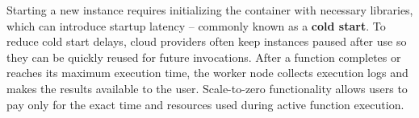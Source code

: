 Starting a new instance requires initializing the container with necessary libraries, which can introduce startup latency -- commonly known as a \textbf{cold start}. To reduce cold start delays, cloud providers often keep instances paused after use so they can be quickly reused for future invocations. After a function completes or reaches its maximum execution time, the worker node collects execution logs and makes the results available to the user. Scale-to-zero functionality allows users to pay only for the exact time and resources used during active function execution.\cite{banaei2022etas}